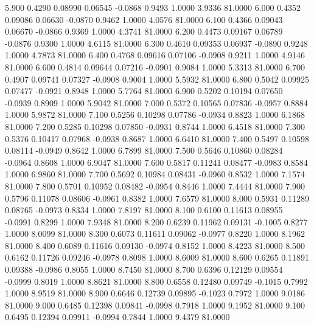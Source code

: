    5.900   0.4290   0.08990   0.06545  -0.0868   0.9493   1.0000   3.9336  81.0000
   6.000   0.4352   0.09086   0.06630  -0.0870   0.9462   1.0000   4.0576  81.0000
   6.100   0.4366   0.09043   0.06670  -0.0866   0.9369   1.0000   4.3741  81.0000
   6.200   0.4473   0.09167   0.06789  -0.0876   0.9300   1.0000   4.6115  81.0000
   6.300   0.4610   0.09353   0.06937  -0.0890   0.9248   1.0000   4.7873  81.0000
   6.400   0.4768   0.09616   0.07106  -0.0908   0.9211   1.0000   4.9146  81.0000
   6.600   0.4814   0.09644   0.07216  -0.0901   0.9084   1.0000   5.3313  81.0000
   6.700   0.4907   0.09741   0.07327  -0.0908   0.9004   1.0000   5.5932  81.0000
   6.800   0.5042   0.09925   0.07477  -0.0921   0.8948   1.0000   5.7764  81.0000
   6.900   0.5202   0.10194   0.07650  -0.0939   0.8909   1.0000   5.9042  81.0000
   7.000   0.5372   0.10565   0.07836  -0.0957   0.8884   1.0000   5.9872  81.0000
   7.100   0.5256   0.10298   0.07786  -0.0934   0.8823   1.0000   6.1868  81.0000
   7.200   0.5285   0.10298   0.07850  -0.0931   0.8744   1.0000   6.4518  81.0000
   7.300   0.5376   0.10417   0.07968  -0.0938   0.8687   1.0000   6.6410  81.0000
   7.400   0.5497   0.10598   0.08114  -0.0949   0.8642   1.0000   6.7899  81.0000
   7.500   0.5646   0.10860   0.08284  -0.0964   0.8608   1.0000   6.9047  81.0000
   7.600   0.5817   0.11241   0.08477  -0.0983   0.8584   1.0000   6.9860  81.0000
   7.700   0.5692   0.10984   0.08431  -0.0960   0.8532   1.0000   7.1574  81.0000
   7.800   0.5701   0.10952   0.08482  -0.0954   0.8446   1.0000   7.4444  81.0000
   7.900   0.5796   0.11078   0.08606  -0.0961   0.8382   1.0000   7.6579  81.0000
   8.000   0.5931   0.11289   0.08765  -0.0973   0.8334   1.0000   7.8197  81.0000
   8.100   0.6100   0.11613   0.08955  -0.0991   0.8299   1.0000   7.9348  81.0000
   8.200   0.6239   0.11962   0.09131  -0.1005   0.8277   1.0000   8.0099  81.0000
   8.300   0.6073   0.11611   0.09062  -0.0977   0.8220   1.0000   8.1962  81.0000
   8.400   0.6089   0.11616   0.09130  -0.0974   0.8152   1.0000   8.4223  81.0000
   8.500   0.6162   0.11726   0.09246  -0.0978   0.8098   1.0000   8.6009  81.0000
   8.600   0.6265   0.11891   0.09388  -0.0986   0.8055   1.0000   8.7450  81.0000
   8.700   0.6396   0.12129   0.09554  -0.0999   0.8019   1.0000   8.8621  81.0000
   8.800   0.6558   0.12480   0.09749  -0.1015   0.7992   1.0000   8.9519  81.0000
   8.900   0.6646   0.12739   0.09895  -0.1023   0.7972   1.0000   9.0186  81.0000
   9.000   0.6485   0.12398   0.09841  -0.0998   0.7918   1.0000   9.1952  81.0000
   9.100   0.6495   0.12394   0.09911  -0.0994   0.7844   1.0000   9.4379  81.0000
